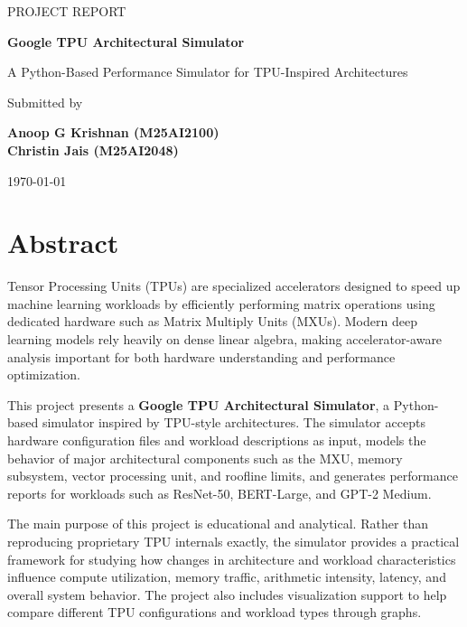 \documentclass[12pt,a4paper]{article}
\begin{document}
	
	\begin{titlepage}
		\centering
		\vspace*{2.2cm}
		{\Large PROJECT REPORT\par}
		\vspace{0.8cm}
		{\Huge \textbf{Google TPU Architectural Simulator}\par}
		\vspace{0.7cm}
		{\Large A Python-Based Performance Simulator for TPU-Inspired Architectures\par}
		\vspace{1.5cm}
		{\Large Submitted by\par}
		\vspace{0.3cm}
		{\Large \textbf{Anoop G Krishnan (M25AI2100)  \\  Christin Jais (M25AI2048)}\par}
		\vfill
		{\Large \today\par}
	\end{titlepage}
	
	
	\section*{Abstract}
	Tensor Processing Units (TPUs) are specialized accelerators designed to speed up machine learning workloads by efficiently performing matrix operations using dedicated hardware such as Matrix Multiply Units (MXUs). Modern deep learning models rely heavily on dense linear algebra, making accelerator-aware analysis important for both hardware understanding and performance optimization.
	
	This project presents a \textbf{Google TPU Architectural Simulator}, a Python-based simulator inspired by TPU-style architectures. The simulator accepts hardware configuration files and workload descriptions as input, models the behavior of major architectural components such as the MXU, memory subsystem, vector processing unit, and roofline limits, and generates performance reports for workloads such as ResNet-50, BERT-Large, and GPT-2 Medium.
	
	The main purpose of this project is educational and analytical. Rather than reproducing proprietary TPU internals exactly, the simulator provides a practical framework for studying how changes in architecture and workload characteristics influence compute utilization, memory traffic, arithmetic intensity, latency, and overall system behavior. The project also includes visualization support to help compare different TPU configurations and workload types through graphs.
	
\end{document}

